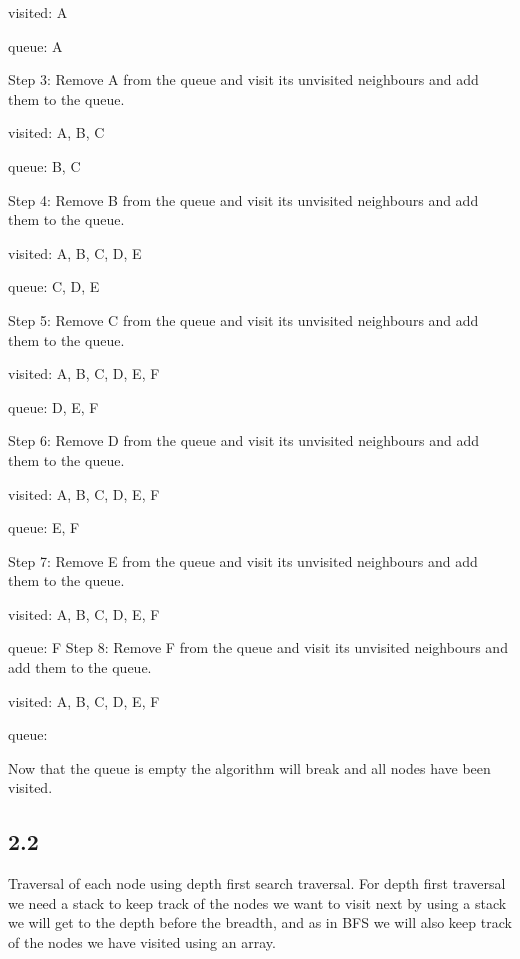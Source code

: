 \documentclass{article}
\begin{document}
visited: A  \newline

queue: A  \newline \newline

Step 3: Remove A from the queue and visit its unvisited neighbours and add them to the queue.

visited: A, B, C \newline

queue: B, C \newline

Step 4: Remove B from the queue and visit its unvisited neighbours and add them to the queue.

visited: A, B, C, D, E \newline

queue: C, D, E \newline 

Step 5: Remove C from the queue and visit its unvisited neighbours and add them to the queue.

visited: A, B, C, D, E, F \newline

queue: D, E, F \newline

Step 6: Remove D from the queue and visit its unvisited neighbours and add them to the queue.

visited: A, B, C, D, E, F \newline

queue: E, F \newline

Step 7: Remove E from the queue and visit its unvisited neighbours and add them to the queue.

visited: A, B, C, D, E, F \newline

queue: F \newline 
Step 8: Remove F from the queue and visit its unvisited neighbours and add them to the queue.

visited: A, B, C, D, E, F \newline

queue:  \newline

Now that the queue is empty the algorithm will break and all nodes have been visited.

\subsection*{2.2}
Traversal of each node using depth first search traversal. For depth first traversal we need a stack to keep track of the nodes we want to 
visit next by using a stack we will get to the depth before the breadth, and as in BFS we will also keep track of the nodes we have visited
using an array.
\end{document}
